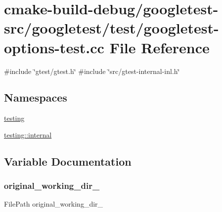 \hypertarget{googletest-options-test_8cc}{}\section{cmake-\/build-\/debug/googletest-\/src/googletest/test/googletest-\/options-\/test.cc File Reference}
\label{googletest-options-test_8cc}
{\ttfamily \#include \char`\"{}gtest/gtest.\+h\char`\"{}}\newline
{\ttfamily \#include \char`\"{}src/gtest-\/internal-\/inl.\+h\char`\"{}}\newline
\subsection*{Namespaces}
\begin{DoxyCompactItemize}
\item 
 \mbox{\hyperlink{namespacetesting}{testing}}
\item 
 \mbox{\hyperlink{namespacetesting_1_1internal}{testing\+::internal}}
\end{DoxyCompactItemize}


\subsection{Variable Documentation}
\mbox{\label{googletest-options-test_8cc_aa5f13fd18a275d0a3117700f30bfb9ff}} 
\subsubsection{\texorpdfstring{original\_working\_dir\_}{original\_working\_dir\_}}
{\footnotesize\ttfamily File\+Path original\+\_\+working\+\_\+dir\+\_\+\hspace{0.3cm}{\ttfamily [protected]}}

